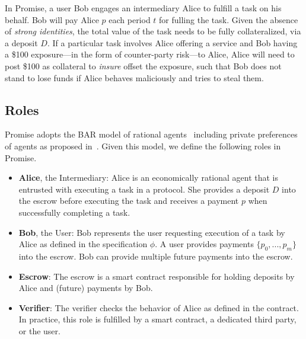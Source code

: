 \documentclass[runningheads]{llncs}
\newcommand{\sys}{Promise\xspace}
\newcommand{\rk}[1]{\todo[linecolor=red,backgroundcolor=red!25,bordercolor=blue,inline,caption={}]{Comment by Rami: #1}}
\newcommand{\dom}[1]{\todo[linecolor=green,backgroundcolor=green!25,bordercolor=green,inline,caption={}]{Comment by Dominik: #1}}
\begin{document}
In \sys, a user Bob engages an intermediary Alice to fulfill a task on his behalf.
Bob will pay Alice $p$ each period $t$ for fulling the task.
Given the absence of \textit{strong identities}, the total value of the task needs to be fully collateralized, via a deposit $D$.
If a particular task involves Alice offering a service and Bob having a \$100 exposure---in the form of counter-party risk---to Alice, Alice will need to post \$100 as collateral to \textit{insure} offset the exposure, such that Bob does not stand to lose funds if Alice behaves maliciously and tries to steal them.

\subsection{Roles}

\sys adopts the BAR model of rational agents~\cite{aiyer2005bar} including private preferences of agents as proposed in~\cite{Harz2019Balance}.
Given this model, we define the following roles in \sys.

\begin{itemize}
    \item \textbf{Alice}, the Intermediary: Alice is an economically rational agent that is entrusted with executing a task in a protocol. She provides a deposit $D$ into the escrow before executing the task and receives a payment $p$ when successfully completing a task.
    \item \textbf{Bob}, the User: Bob represents the user requesting execution of a task by Alice as defined in the specification $\phi$. A user provides payments $\{p_0, ..., p_m\}$ into the escrow. Bob can provide multiple future payments into the escrow.
    \item \textbf{Escrow}: The escrow is a smart contract responsible for holding deposits by Alice and (future) payments by Bob.
    \item \textbf{Verifier}: The verifier checks the behavior of Alice as defined in the contract. In practice, this role is fulfilled by a smart contract, a dedicated third party, or the user.
\end{itemize}



\end{document}
